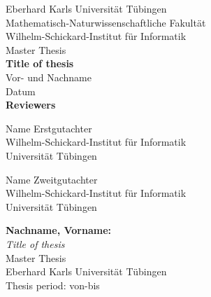\documentclass[twoside,12pt,a4paper]{report}
\begin{document}
 
\begin{titlepage}
 \begin{center}
  {\LARGE Eberhard Karls Universität Tübingen}\\
  {\large Mathematisch-Naturwissenschaftliche Fakultät \\
Wilhelm-Schickard-Institut für Informatik\\[4cm]}
  {\huge Master Thesis\\[2cm]}
  {\Large\bf  Title of thesis\\[1.5cm]}
 {\large Vor- und Nachname}\\[0.5cm]
Datum\\[4cm]
{\small\bf Reviewers}\\[0.5cm]
  \parbox{7cm}{\begin{center}{\large Name Erstgutachter}\\
  {\footnotesize Wilhelm-Schickard-Institut für Informatik\\
	Universität Tübingen}\end{center}}\hfill\parbox{7cm}{\begin{center}
  {\large Name Zweitgutachter}\\
  {\footnotesize Wilhelm-Schickard-Institut für Informatik\\
	Universität Tübingen}\end{center}
 }
  \end{center}
\end{titlepage}


\thispagestyle{empty}
\vspace*{\fill}
\begin{minipage}{11.2cm}
\textbf{Nachname, Vorname:}\\
\emph{Title of thesis}\\ Master Thesis\\
Eberhard Karls Universität Tübingen\\
Thesis period: von-bis
\end{minipage}
\newpage

\end{document}
